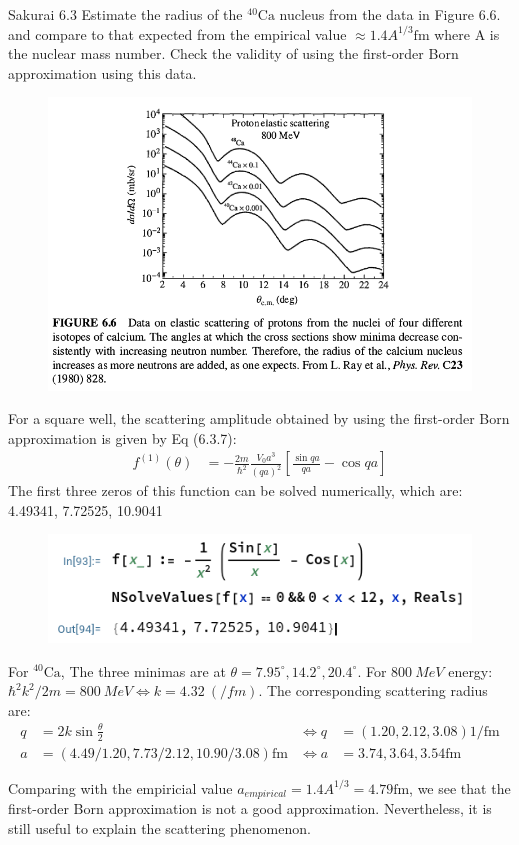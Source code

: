 \documentclass{article}
\begin{document}
\newpage
\begin{section}{Sakurai 6.3}
\newcommand{\Ca}{\text{Ca}}
Estimate the radius of the $^{40}\Ca$ nucleus from the data in Figure 6.6. and compare to that expected from the empirical value $\approx 1.4 A^{1/3}\text{fm}$ where A is the nuclear mass number. Check the validity of using the first-order Born approximation using this data.
\begin{figure}[H]
	\centering
	\includegraphics[width=0.7\linewidth]{fig6-6.png}
\end{figure}

\begin{tcolorbox}[breakable]
	For a square well, the scattering amplitude obtained by using the first-order Born approximation is given by Eq (6.3.7):
	\begin{align*}
		f^{(1)}(\theta) & = -\frac{2m}{\hbar^2} \frac{V_0a^3}{(qa)^2} \left[ \frac{\sin qa}{qa} - \cos qa \right]
	\end{align*}
	The first three zeros of this function can be solved numerically, which are: 4.49341, 7.72525, 10.9041
	\begin{figure}[H]
		\centering
		\includegraphics[width=0.5\linewidth]{figMathematicaBorn.png}
	\end{figure}

	For $^40\Ca$, The three minimas are at $\theta = 7.95^\circ, 14.2^\circ, 20.4^\circ$. For $\SI{800}{MeV}$ energy: $\hbar^2k^2/2m = \SI{800}{MeV} \iff k = \SI{4.32}{(/fm)}$. The corresponding scattering radius are:
	\begin{align*}
		q & = 2k\sin\frac{\theta}{2}                       & \iff q & = (1.20, 2.12, 3.08) \text{1/fm} \\
		a & = (4.49/1.20, 7.73/2.12, 10.90/3.08) \text{fm} & \iff a & = 3.74, 3.64, 3.54 \text{fm}
	\end{align*}

	Comparing with the empiricial value $a_{empirical} = 1.4A^{1/3} = 4.79\text{fm}$, we see that the first-order Born approximation is not a good approximation. Nevertheless, it is still useful to explain the scattering phenomenon.
\end{tcolorbox}
\end{section}
\end{document}
